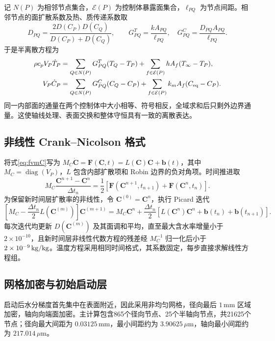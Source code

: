记 $N(P)$ 为相邻节点集合，$\mathcal E(P)$ 为控制体暴露面集合，$\ell_{PQ}$ 为节点间距。相邻节点的面扩散系数及热、质传递系数取
\begin{equation}
 D_{PQ}=\frac{2D(C_P)D(C_Q)}{D(C_P)+D(C_Q)},\qquad
 G^T_{PQ}=\frac{kA_{PQ}}{\ell_{PQ}},\quad
 G^C_{PQ}=\frac{D_{PQ}A_{PQ}}{\ell_{PQ}}.
 \label{eq:face}
\end{equation}
于是半离散方程为
\begin{align}
 \rho c_pV_P\dot T_P
 &=\sum_{Q\in N(P)}G^T_{PQ}(T_Q-T_P)
   +\sum_{f\in\mathcal E(P)}hA_f(T_{\infty}-T_P),\label{eq:fvmT}\\
 V_P\dot C_P
 &=\sum_{Q\in N(P)}G^C_{PQ}(C_Q-C_P)
   +\sum_{f\in\mathcal E(P)}k_mA_f(C_{\mathrm{eq}}-C_P).\label{eq:fvmC}
\end{align}
同一内部面的通量在两个控制体中大小相等、符号相反，全域求和后只剩外边界通量。这使轴线处理、表面交换和整体守恒具有一致的离散表达。

\subsection{非线性 Crank--Nicolson 格式}
将式\eqref{eq:fvmC}写为 $M_C\dot{\bm C}=\bm F(\bm C,t)=L(\bm C)\bm C+\bm b(t)$，其中 $M_C=\operatorname{diag}(V_P)$，$L$ 包含内部扩散项和 Robin 边界的负对角项。时间推进取
\begin{equation}
 M_C\frac{\bm C^{n+1}-\bm C^n}{\Delta t_n}
 =\frac12\left[\bm F(\bm C^{n+1},t_{n+1})+\bm F(\bm C^n,t_n)\right].
 \label{eq:cn}
\end{equation}
为保留新时间层扩散率的非线性，令 $\bm C^{(0)}=\bm C^n$，执行 Picard 迭代
\begin{equation}
 \left[M_C-\frac{\Delta t_n}{2}L(\bm C^{(m)})\right]\bm C^{(m+1)}
 =M_C\bm C^n+\frac{\Delta t_n}{2}
 \left[L(\bm C^n)\bm C^n+\bm b(t_n)+\bm b(t_{n+1})\right].
 \label{eq:picard}
\end{equation}
每次迭代均更新 $D(\bm C^{(m)})$ 及其面调和平均，直至最大含水率增量小于 $2\times10^{-10}$，且新时间层非线性代数方程的残差经 $M_C^{-1}$ 归一化后小于 $2\times10^{-9}\,\mathrm{kg/kg}$。温度方程采用相同时间格式，其系数固定，每步直接求解线性方程组。

\clearpage
\subsection{网格加密与初始启动层}
启动后水分梯度首先集中在表面附近，因此采用非均匀网格，径向最后 $1\,\mathrm{mm}$ 区域加密，轴向向端面加密。主计算包含865个径向节点、25个半轴向节点，共21625个节点；径向最大间距为 $0.03125\,\mathrm{mm}$，最小间距约为 $3.90625\,\mu\mathrm{m}$，轴向最小间距约为 $217.014\,\mu\mathrm{m}$。

